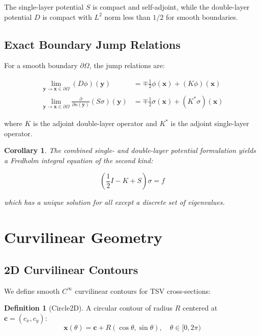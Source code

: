 \documentclass[12pt]{article}
\newtheorem{corollary}{Corollary}
\theoremstyle{definition}
\newtheorem{definition}{Definition}
\begin{document}
The single-layer potential $S$ is compact and self-adjoint, while the double-layer potential $D$ is compact with $L^2$ norm less than $1/2$ for smooth boundaries.

\subsection{Exact Boundary Jump Relations}

For a smooth boundary $\partial \Omega$, the jump relations are:

\begin{align}
\lim_{\mathbf{y} \to \mathbf{x} \in \partial \Omega} (D \phi)(\mathbf{y}) &= \mp \frac{1}{2} \phi(\mathbf{x}) + (K \phi)(\mathbf{x}) \\
\lim_{\mathbf{y} \to \mathbf{x} \in \partial \Omega} \frac{\partial}{\partial n(\mathbf{y})} (S \sigma)(\mathbf{y}) &= \mp \frac{1}{2} \sigma(\mathbf{x}) + (K^* \sigma)(\mathbf{x})
\end{align}

where $K$ is the adjoint double-layer operator and $K^*$ is the adjoint single-layer operator.

\begin{corollary}
The combined single- and double-layer potential formulation yields a Fredholm integral equation of the second kind:

\begin{equation}
\left(\frac{1}{2} I - K + S\right) \sigma = f
\end{equation}

which has a unique solution for all except a discrete set of eigenvalues.
\end{corollary}

\section{Curvilinear Geometry}

\subsection{2D Curvilinear Contours}

We define smooth $C^\infty$ curvilinear contours for TSV cross-sections:

\begin{definition}[Circle2D]
A circular contour of radius $R$ centered at $\mathbf{c} = (c_x, c_y)$:
\begin{equation}
\mathbf{x}(\theta) = \mathbf{c} + R (\cos \theta, \sin \theta), \quad \theta \in [0, 2\pi)
\end{equation}
\end{definition}
\end{document}
